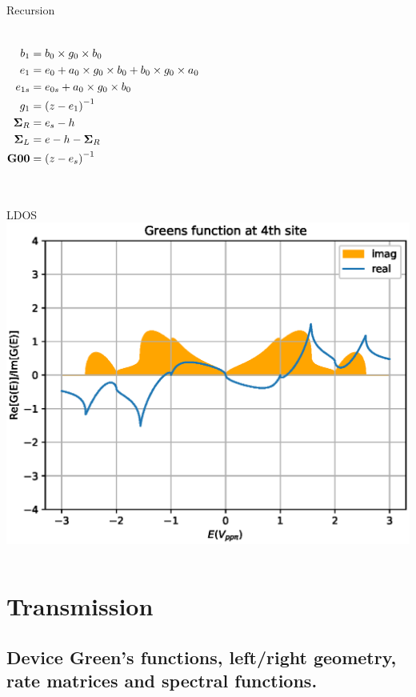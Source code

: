 \documentclass[hyperref={colorlinks=true,urlcolor=blue,linkcolor=.},aspectratio=1610,mathserif]{beamer}
\newcommand{\im}[3]{\inputminted[linenos=true, python3=true, firstline=#2, lastline=#3]{python}{#1}}
\begin{document}
\begin{frame}{Recursion}
\begin{overprint}
\begin{center}
\begin{columns}[c]
\begin{align*}
					b_1           & = b_0 \times g_0 \times b_0                                   \\
					e_1           & = e_0 + a_0 \times g_0 \times b_0 + b_0 \times g_0 \times a_0 \\
					e_{1s}        & = e_{0s} + a_0 \times g_0 \times b_0                          \\
					g_1           & = \pqty{z-e_1}^{-1}                                           \\
					\vb{\Sigma}_R & = e_s - h                                                     \\
					\vb{\Sigma}_L & = e - h - \vb{\Sigma}_R                                       \\
					\vb{G00}      & = \pqty{z-e_s}^{-1}
				\end{align*}
			\end{columns}
		\end{center}
		\im{Listings/Functions.py}{92}{109}
	\end{overprint}
\end{frame}

\begin{frame}{LDOS}
	\centering
	\includegraphics[width=.7\textwidth]{Figures/BetaimrealTE.eps}
	\im{Listings/SelfEnergyByRecursion.py}{64}{68}
\end{frame}

\section{Transmission}
\subsection{Device Green's functions, left/right geometry, rate matrices and spectral functions.}
\end{document}
